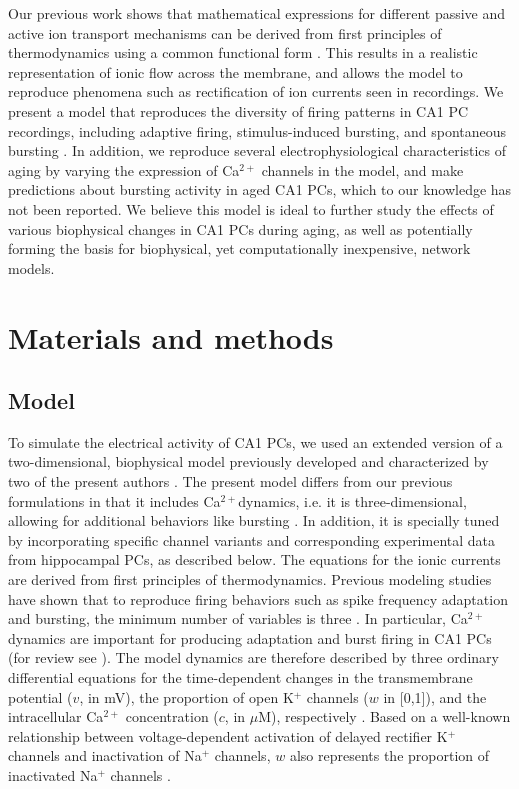 \documentclass[10pt,letterpaper]{article}
\newcommand{\Ca}{Ca$^{2+}$}
\newcommand{\K}{K$^{+}$}
\newcommand{\Na}{Na$^{+}$}
\begin{document}
Our previous work shows that mathematical expressions for different passive and active ion transport mechanisms can be derived from first principles of thermodynamics \cite{herrera2012membranes,herrera2013relating} using a common functional form \cite{herrera2018thermodynamic}. This results in a realistic representation of ionic flow across the membrane, and allows the model to reproduce phenomena such as rectification of ion currents seen in recordings. We present a model that reproduces the diversity of firing patterns in CA1 PC recordings, including adaptive firing, stimulus-induced bursting, and spontaneous bursting \cite{mckiernan2017ca1}. In addition, we reproduce several electrophysiological characteristics of aging by varying the expression of Ca$^{2+}$ channels in the model, and make predictions about bursting activity in aged CA1 PCs, which to our knowledge has not been reported. We believe this model is ideal to further study the effects of various biophysical changes in CA1 PCs during aging, as well as potentially forming the basis for biophysical, yet computationally inexpensive, network models.

\section*{Materials and methods}

\subsection*{Model}
To simulate the electrical activity of CA1 PCs, we used an extended version of a two-dimensional, biophysical model previously developed and characterized by two of the present authors  \cite{herrera2012membranes,herrera2013relating,herrera2018thermodynamic}. The present model differs from our previous formulations in that it includes \Ca dynamics, i.e. it is three-dimensional, allowing for additional behaviors like bursting \cite{avron1993basic}. In addition, it is specially tuned by incorporating specific channel variants and corresponding experimental data from hippocampal PCs, as described below. The equations for the ionic currents are derived from first principles of thermodynamics. Previous modeling studies have shown that to reproduce firing behaviors such as spike frequency adaptation and bursting, the minimum number of variables is three \cite{hindmarsh1984model,avron1993basic}. 
In particular, {\Ca} dynamics are important for producing adaptation and burst firing in CA1 PCs (for review see \cite{mckiernan2017ca1}). 
The model dynamics are therefore described by three ordinary differential equations for the time-dependent changes in the transmembrane potential ($v$, in mV), the proportion of open {\K} channels ($w$ in [0,1]), and the intracellular {\Ca} concentration ($c$, in $\mu$M), respectively   \cite{herrera2018thermodynamic}. Based on a well-known relationship between voltage-dependent activation of delayed rectifier {\K} channels and inactivation of {\Na} channels, $w$ also represents the proportion of inactivated {\Na} channels \cite{rinzel1985excitation,avron1991minimal}.
\end{document}
